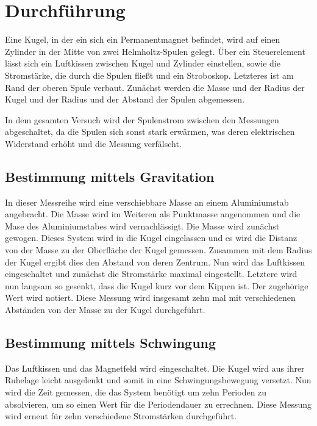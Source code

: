 \section{Durchführung}
\label{sec:Durchführung}

Eine Kugel, in der ein sich ein Permanentmagnet befindet, wird auf einen Zylinder in der Mitte von zwei Helmholtz-Spulen gelegt.
Über ein Steuerelement lässt sich ein Luftkissen zwischen Kugel und Zylinder einstellen, sowie die Stromstärke, die durch die Spulen fließt und ein Stroboskop. 
Letzteres ist am Rand der oberen Spule verbaut.
Zunächst werden die Masse und der Radius der Kugel und der Radius und der Abstand der Spulen abgemessen.

In dem gesamten Versuch wird der Spulenstrom zwischen den Messungen abgeschaltet, da die Spulen sich sonst stark erwärmen, was deren elektrischen Widerstand erhöht und die Messung verfälscht.

\subsection{Bestimmung mittels Gravitation}

In dieser Messreihe wird eine verschiebbare Masse an einem Aluminiumstab angebracht. Die Masse wird im Weiteren als Punktmasse angenommen und die Mase des Aluminiumstabes wird vernachlässigt.
Die Masse wird zunächst gewogen.
Dieses System wird in die Kugel eingelassen und es wird die Distanz von der Masse zu der Oberfläche der Kugel gemessen. Zusammen mit dem Radius der Kugel ergibt dies den Abstand von deren Zentrum.
Nun wird das Luftkissen eingeschaltet und zunächst die Stromstärke maximal eingestellt. Letztere wird nun langsam so gesenkt, dass die Kugel kurz vor dem Kippen ist. Der zugehörige Wert wird notiert.
Diese Messung wird insgesamt zehn mal mit verschiedenen Abständen von der Masse zu der Kugel durchgeführt.

\subsection{Bestimmung mittels Schwingung}

Das Luftkissen und das Magnetfeld wird eingeschaltet. Die Kugel wird aus ihrer Ruhelage leicht ausgelenkt und somit in eine Schwingungsbewegung versetzt.
Nun wird die Zeit gemessen, die das System benötigt um zehn Perioden zu absolvieren, um so einen Wert für die Periodendauer zu errechnen.
Diese Messung wird erneut für zehn verschiedene Stromstärken durchgeführt.

